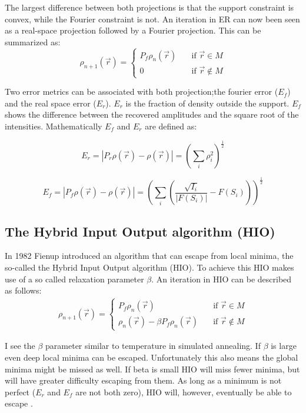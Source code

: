 The largest difference between both projections is that the support constraint is convex, while the Fourier constraint is not. An iteration in ER can now been seen as a real-space projection followed by a Fourier projection. This can be summarized as:
\begin{equation}
\rho_{n+1}\left(\vec{r}\right) = \begin{cases} P_f\rho_{n}\left(\vec{r}\right) \quad &\mathrm{if}\,\,
    \vec{r} \in M\\0 \quad & \mathrm{if}\,\, \vec{r} \not\in M \end{cases}
\end{equation}

Two error metrics can be associated with both projection;the fourier error ($E_f$) and the real space error ($E_r$). $E_r$ is the fraction of density outside the support. $E_f$ shows the difference between the recovered amplitudes and the square root of the intensities. Mathematically $E_f$ and $E_r$ are defined as:

\begin{equation}
E_r = \left|P_r\rho(\vec{r}) - \rho(\vec{r})\right| = \left(\sum_i\rho_i^2\right)^{\frac{1}{2}}
\end{equation}

\begin{equation}
E_f = \left|P_f\rho(\vec{r}) - \rho(\vec{r})\right| = \left(\sum_{i}\left(\frac{\sqrt{I_i}}{|F(S_i)|}- F(S_i)\right)\right)^{\frac{1}{2}}
\end{equation}
  
\subsection{The Hybrid Input Output algorithm (HIO)}
In 1982 Fienup introduced an algorithm that can escape from local minima, the so-called the Hybrid Input Output algorithm (HIO). To achieve this HIO makes use of a so called relaxation parameter $\beta$. An iteration in HIO can be described as follows:
\begin{align}
\rho_{n+1}\left(\vec{r}\right) = \begin{cases} P_f \rho_{n}\left(\vec{r}\right) \quad &\mathrm{if}\,\,
    \vec{r} \in M\\\rho_n(\vec{r}) -\beta P_f \rho_n(\vec{r}) \quad & \mathrm{if}\,\, \vec{r} \not\in M \end{cases}
\end{align}

I see the $\beta$ parameter similar to temperature in simulated annealing. If $\beta$ is large even deep local minima can be escaped. Unfortunately this also means the global minima might be missed as well. If beta is small HIO will miss fewer minima, but will have greater difficulty escaping from them. As long as a minimum is not perfect ($E_r$ and $E_f$ are not both zero), HIO will, however, eventually be able to escape \cite{Martin2010}.

